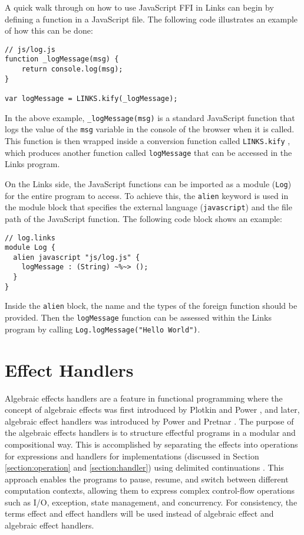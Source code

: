 \documentclass[logo,bsc,singlespacing,parskip]{infthesis}
\begin{document}
A quick walk through on how to use JavaScript FFI in Links can begin by defining a function in a JavaScript file. The following code illustrates an example of how this can be done:
\begin{verbatim}
// js/log.js
function _logMessage(msg) {
    return console.log(msg);
}

var logMessage = LINKS.kify(_logMessage);
\end{verbatim}
In the above example, \texttt{\_logMessage(msg)} is a standard JavaScript function that logs the value of the \texttt{msg} variable in the console of the browser when it is called. This function is then wrapped inside a conversion function called \texttt{LINKS.kify} \cite{links_ffi}, which produces another function called \texttt{logMessage} that can be accessed in the Links program.

On the Links side, the JavaScript functions can be imported as a module (\texttt{Log}) for the entire program to access. To achieve this, the \texttt{alien} keyword is used in the module block that specifies the external language (\texttt{javascript}) and the file path of the JavaScript function. The following code block shows an example:
\begin{verbatim}
// log.links
module Log {
  alien javascript "js/log.js" {
    logMessage : (String) ~%~> ();
  }
}
\end{verbatim}
Inside the \texttt{alien} block, the name and the types of the foreign function should be provided. Then the \texttt{logMessage} function can be assessed within the Links program by calling \texttt{Log.logMessage("Hello World")}.

\section{Effect Handlers}
Algebraic effects handlers are a feature in functional programming where the concept of algebraic effects was first introduced by Plotkin and Power \cite{plotkin_effect}, and later, algebraic effect handlers was introduced by Power and Pretnar \cite{plotkin_pretnar_2013}. The purpose of the algebraic effects handlers is to structure effectful programs in a modular and compositional way. This is accomplished by separating the effects into operations for expressions and handlers for implementations (discussed in Section \ref{section:operation} and \ref{section:handler}) using delimited continuations \cite{forster_kammar_lindley_pretnar_2019}. This approach enables the programs to pause, resume, and switch between different computation contexts, allowing them to express complex control-flow operations such as I/O, exception, state management, and concurrency. For consistency, the terms effect and effect handlers will be used instead of algebraic effect and algebraic effect handlers.
\end{document}
